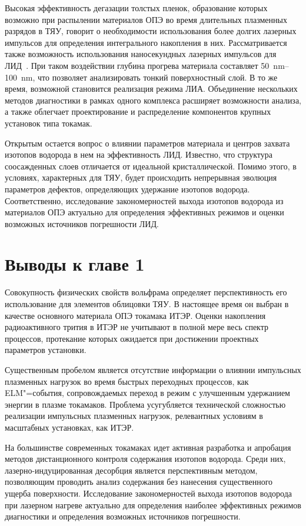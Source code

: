 Высокая эффективность дегазации толстых пленок, образование которых возможно при распылении материалов ОПЭ во время длительных плазменных разрядов в ТЯУ, говорит о необходимости использования более долгих лазерных импульсов для определения интегрального накопления в них. Рассматривается также возможность использования наносекундных лазерных импульсов для ЛИД~\cite{Medvedev2024, Gasparyan2021, Efimov2024}. При таком воздействии глубина прогрева материала составляет \SIrange{50}{100}{\nano\meter}, что позволяет анализировать тонкий поверхностный слой. В то же время, возможной становится реализация режима ЛИА. Объединение нескольких методов диагностики в рамках одного комплекса расширяет возможности анализа, а также облегчает проектирование и распределение компонентов крупных установок типа токамак.

Открытым остается вопрос о влиянии параметров материала и центров захвата изотопов водорода в нем на эффективность ЛИД. Известно, что структура соосажденных слоев отличается от идеальной кристаллической. Помимо этого, в условиях, характерных для ТЯУ, будет происходить непрерывная эволюция параметров дефектов, определяющих удержание изотопов водорода. Соответственно, исследование закономерностей выхода изотопов водорода из материалов ОПЭ актуально для определения эффективных режимов и оценки возможных источников погрешности ЛИД. 

\section{Выводы к главе 1}

Совокупность физических свойств вольфрама определяет перспективность его использование для элементов облицовки ТЯУ. В настоящее время он выбран в качестве основного материала ОПЭ токамака ИТЭР. Оценки накопления радиоактивного трития в ИТЭР не учитывают в полной мере весь спектр процессов, протекание которых ожидается при достижении проектных параметров установки. 

Существенным пробелом является отсутствие информации о влиянии импульсных плазменных нагрузок во время быстрых переходных процессов, как ELM"=события, сопровождаемых переход в режим с улучшенным удержанием энергии в плазме токамаков. Проблема усугубляется технической сложностью реализации импульсных плазменных нагрузок, релевантных условиям в масштабных установках, как ИТЭР. 

На большинстве современных токамаках идет активная разработка и апробация методов дистанционного контроля содержания изотопов водорода. Среди них, лазерно-индуцированная десорбция является перспективным методом, позволяющим проводить анализ содержания без нанесения существенного ущерба поверхности. Исследование закономерностей выхода изотопов водорода при лазерном нагреве актуально для определения наиболее эффективных режимов диагностики и определения возможных источников погрешности.


\FloatBarrier
